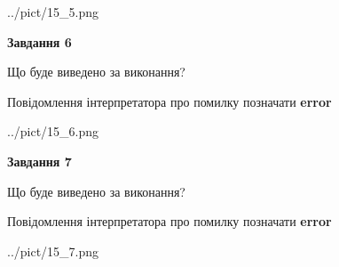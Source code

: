 \documentclass[10pt, ukrainian]{article}
\begin{document}
{\begin {large}
\begin{center}
	{../pict/15_5.png}
\end{center}
\newpage

{\begin {center}\textbf{Завдання 6}\end {center}}\par
Що буде виведено за виконання? \par
Повідомлення інтерпретатора про помилку позначати \textbf{error}

\begin{center}
	{../pict/15_6.png}
\end{center}
\newpage

{\begin {center}\textbf{Завдання 7}\end {center}}\par
Що буде виведено за виконання? \par
Повідомлення інтерпретатора про помилку позначати \textbf{error}

\begin{center}
	{../pict/15_7.png}
\end{center}
\newpage

\end {large}}
\end{document}
